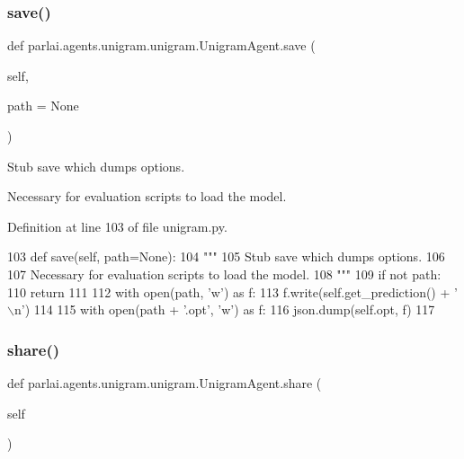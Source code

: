 \subsubsection{\texorpdfstring{save()}{save()}}
{\footnotesize\ttfamily def parlai.\+agents.\+unigram.\+unigram.\+Unigram\+Agent.\+save (\begin{DoxyParamCaption}\item[{}]{self,  }\item[{}]{path = {\ttfamily None} }\end{DoxyParamCaption})}

\begin{DoxyVerb}Stub save which dumps options.

Necessary for evaluation scripts to load the model.
\end{DoxyVerb}
 

Definition at line 103 of file unigram.\+py.


\begin{DoxyCode}
103     \textcolor{keyword}{def }save(self, path=None):
104         \textcolor{stringliteral}{"""}
105 \textcolor{stringliteral}{        Stub save which dumps options.}
106 \textcolor{stringliteral}{}
107 \textcolor{stringliteral}{        Necessary for evaluation scripts to load the model.}
108 \textcolor{stringliteral}{        """}
109         \textcolor{keywordflow}{if} \textcolor{keywordflow}{not} path:
110             \textcolor{keywordflow}{return}
111 
112         with open(path, \textcolor{stringliteral}{'w'}) \textcolor{keyword}{as} f:
113             f.write(self.get\_prediction() + \textcolor{stringliteral}{'\(\backslash\)n'})
114 
115         with open(path + \textcolor{stringliteral}{'.opt'}, \textcolor{stringliteral}{'w'}) \textcolor{keyword}{as} f:
116             json.dump(self.opt, f)
117 
\end{DoxyCode}
\mbox{\label{classparlai_1_1agents_1_1unigram_1_1unigram_1_1UnigramAgent_a92213f8bec03859a310d5535a077e999}} 
\subsubsection{\texorpdfstring{share()}{share()}}
{\footnotesize\ttfamily def parlai.\+agents.\+unigram.\+unigram.\+Unigram\+Agent.\+share (\begin{DoxyParamCaption}\item[{}]{self }\end{DoxyParamCaption})}

